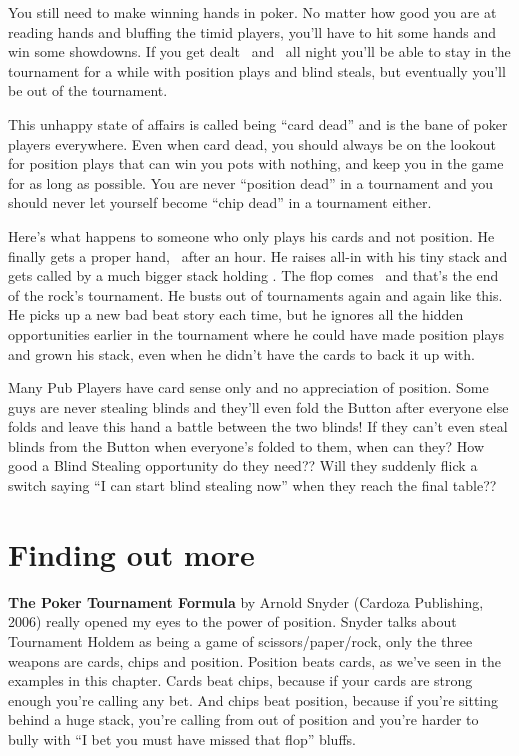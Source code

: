 You still need to make winning hands in poker. No matter how good you
are at reading hands and bluffing the timid players, you'll have to
hit some hands and win some showdowns. If you get dealt
\tenh\twoc\ and \Qh\fivec\ all night you'll be able to stay in
the tournament for a while with position plays and blind steals,
but eventually you'll be out of the tournament.

This unhappy state of affairs is called being ``card dead'' and is
the bane of poker players everywhere. Even when card dead, you should always
be on the lookout for position plays that can win you pots with nothing,
and keep you in the game for as long as possible. You are never
``position dead'' in a tournament and you should never let yourself
become ``chip dead'' in a tournament either.

Here's what happens to someone who only plays his cards and not position.
He finally gets a proper hand, \tenh\tenc\ after an hour. He raises all-in
with his tiny stack and gets called by a much bigger stack
holding \Kd\Qd. The flop comes \Kh\sixc\trec\ and that's the
end of the rock's tournament. He busts out of tournaments again and
again like this. He picks up a new bad beat story each time, but he
ignores all the hidden opportunities earlier in the tournament
where he could have made position plays and grown his stack,
even when he didn't have the cards to back it up with.

Many Pub Players have card sense only and no appreciation of position.
Some guys are never stealing blinds and they'll even fold the
Button after everyone else folds and leave this hand a battle between the
two blinds! If they can't even steal blinds from the Button when everyone's
folded to them, when can they? How good a Blind Stealing opportunity do
they need?? Will they suddenly flick a switch saying ``I can start
blind stealing now'' when they reach the final table??

\section{Finding out more}

\textbf{The Poker Tournament Formula} by Arnold Snyder
(Cardoza Publishing, 2006) really opened my eyes to the power of position.
Snyder talks about
Tournament Holdem as being a game of scissors/paper/rock, only the
three weapons are cards, chips and position. Position beats cards, as we've
seen in the examples in this chapter. Cards beat chips, because if your
cards are strong enough you're calling any bet. And chips beat position,
because if you're sitting behind a huge stack, you're calling
from out of position and you're harder to bully with ``I bet you
must have missed that flop'' bluffs.

